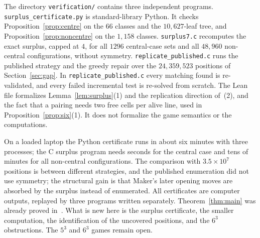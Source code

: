 \documentclass[11pt]{amsart}
\theoremstyle{definition}
\theoremstyle{remark}
\begin{document}
The directory \texttt{verification/} contains three independent programs. \texttt{surplus\_certificate.py} is standard-library Python. It checks Proposition~\ref{prop:centre} on the $66$ classes and the $10{,}627$-leaf tree, and Proposition~\ref{prop:noncentre} on the $1{,}158$ classes. \texttt{surplus7.c} recomputes the exact surplus, capped at $4$, for all $1296$ central-case sets and all $48{,}960$ non-central configurations, without symmetry. \texttt{replicate\_published.c} runs the published strategy and the greedy repair over the $24{,}359{,}523$ positions of Section~\ref{sec:gap}. In \texttt{replicate\_published.c} every matching found is re-validated, and every failed incremental test is re-solved from scratch. The Lean file formalizes Lemma~\ref{lem:surplus}(1) and the replication direction of~(2), and the fact that a pairing needs two free cells per alive line, used in Proposition~\ref{prop:six}(1). It does not formalize the game semantics or the computations.

On a loaded laptop the Python certificate runs in about six minutes with three processes; the C surplus program needs seconds for the central case and tens of minutes for all non-central configurations. The comparison with $3.5\times10^7$ positions is between different strategies, and the published enumeration did not use symmetry; the structural gain is that Maker's later opening moves are absorbed by the surplus instead of enumerated. All certificates are computer outputs, replayed by three programs written separately. Theorem~\ref{thm:main} was already proved in~\cite{CRK2025}. What is new here is the surplus certificate, the smaller computation, the identification of the uncovered positions, and the $6^3$ obstructions. The $5^3$ and $6^3$ games remain open.



\end{document}
